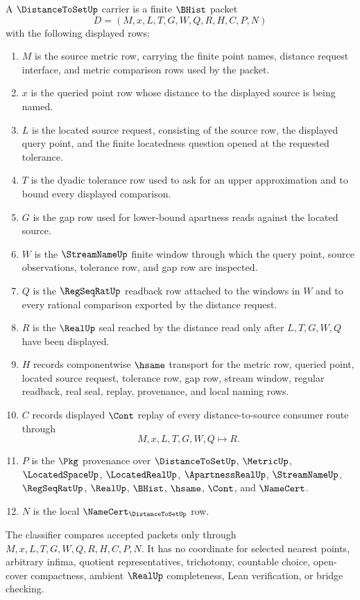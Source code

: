 \begin{definition}
\label{def:distance-to-set-carrier}
A $\DistanceToSetUp$ carrier is a finite $\BHist$ packet
$$
D=(M,x,L,T,G,W,Q,R,H,C,P,N)
$$
with the following displayed rows:
\begin{enumerate}
\item $M$ is the source metric row, carrying the finite point names, distance request interface, and metric comparison rows used by the packet.
\item $x$ is the queried point row whose distance to the displayed source is being named.
\item $L$ is the located source request, consisting of the source row, the displayed query point, and the finite locatedness question opened at the requested tolerance.
\item $T$ is the dyadic tolerance row used to ask for an upper approximation and to bound every displayed comparison.
\item $G$ is the gap row used for lower-bound apartness reads against the located source.
\item $W$ is the $\StreamNameUp$ finite window through which the query point, source observations, tolerance row, and gap row are inspected.
\item $Q$ is the $\RegSeqRatUp$ readback row attached to the windows in $W$ and to every rational comparison exported by the distance request.
\item $R$ is the $\RealUp$ seal reached by the distance read only after $L,T,G,W,Q$ have been displayed.
\item $H$ records componentwise $\hsame$ transport for the metric row, queried point, located source request, tolerance row, gap row, stream window, regular readback, real seal, replay, provenance, and local naming rows.
\item $C$ records displayed $\Cont$ replay of every distance-to-source consumer route through
$$
M,x,L,T,G,W,Q \longmapsto R .
$$
\item $P$ is the $\Pkg$ provenance over $\DistanceToSetUp$, $\MetricUp$, $\LocatedSpaceUp$, $\LocatedRealUp$, $\ApartnessRealUp$, $\StreamNameUp$, $\RegSeqRatUp$, $\RealUp$, $\BHist$, $\hsame$, $\Cont$, and $\NameCert$.
\item $N$ is the local $\NameCert_{\DistanceToSetUp}$ row.
\end{enumerate}
The classifier compares accepted packets only through $M,x,L,T,G,W,Q,R,H,C,P,N$. It has no coordinate for selected nearest points, arbitrary infima, quotient representatives, trichotomy, countable choice, open-cover compactness, ambient $\RealUp$ completeness, Lean verification, or bridge checking.
\end{definition}

